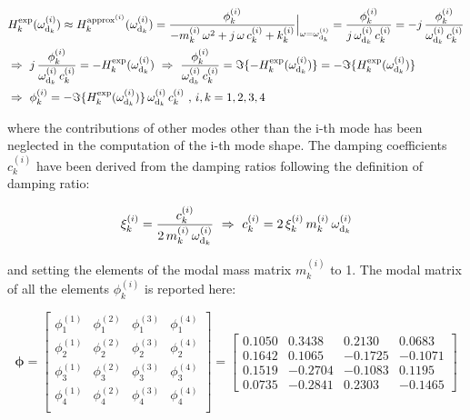 \documentclass[a4paper,12pt,oneside]{article}
\begin{document}
\[ \begin{split}
	& H^{\textup{exp}}_k(\omega_{\textup{d}_k}^{(i)}) \approx %
		H^{\textup{approx}^{(i)}}_k(\omega_{\textup{d}_k}^{(i)}) = %
		\frac{\phi^{(i)}_k} %
		{-m^{(i)}_k \, \omega^2 + j \, \omega \, c^{(i)}_k + k^{(i)}_k} %
		\Big|_{\omega = \omega_{\textup{d}_k}^{(i)}} = %
		\frac{\phi^{(i)}_k}{j \, \omega_{\textup{d}_k}^{(i)} \, c^{(i)}_k} = %
		-j \, \frac{\phi^{(i)}_k}{\omega_{\textup{d}_k}^{(i)} \, c^{(i)}_k} \\
	& \Rightarrow ~ %
		j \, \frac{\phi^{(i)}_k}{\omega_{\textup{d}_k}^{(i)} \, c^{(i)}_k} = %
		- H^{\textup{exp}}_k(\omega_{\textup{d}_k}^{(i)}) %
		~ \Rightarrow ~ \frac{\phi^{(i)}_k}{\omega_{\textup{d}_k}^{(i)} \, c^{(i)}_k} = %
		\Im\{- H^{\textup{exp}}_k(\omega_{\textup{d}_k}^{(i)})\} = %
		- \Im\{H^{\textup{exp}}_k(\omega_{\textup{d}_k}^{(i)})\} \\
	& \Rightarrow ~ \phi^{(i)}_k = %
		- \Im\{H^{\textup{exp}}_k(\omega_{\textup{d}_k}^{(i)})\} %
		\, \omega_{\textup{d}_k}^{(i)} \, c^{(i)}_k ~ \text{,} ~ i,k = 1,2,3,4
\end{split} \]

where the contributions of other modes other than the i-th mode has been neglected in the computation of the i-th mode shape. The damping coefficients $ c^{(i)}_k $ have been derived from the damping ratios following the definition of damping ratio:

\[ \begin{split}
	\xi^{(i)}_k = \frac{c^{(i)}_k}{2 \, m^{(i)}_k \, \omega_{\textup{d}_k}^{(i)}} %
		~ \Rightarrow ~ c^{(i)}_k = 2 \, \xi^{(i)}_k \, m^{(i)}_k \, %
		\omega_{\textup{d}_k}^{(i)}
\end{split} \]

and setting the elements of the modal mass matrix $ m^{(i)}_k $ to 1.
The modal matrix of all the elements $ \phi^{(i)}_k $ is reported here:

\[
	\bm{\phi} =	\begin{bmatrix}
								\phi_1^{(1)}	& \phi_1^{(2)} & \phi_1^{(3)}	& \phi_1^{(4)} \\
								\phi_2^{(1)}	& \phi_2^{(2)} & \phi_2^{(3)}	& \phi_2^{(4)} \\
								\phi_3^{(1)}	& \phi_3^{(2)} & \phi_3^{(3)}	& \phi_3^{(4)} \\
								\phi_4^{(1)}	& \phi_4^{(2)} & \phi_4^{(3)}	& \phi_4^{(4)} \\
							\end{bmatrix} = \begin{bmatrix}
																0.1050	& 0.3438	& 0.2130	& 0.0683 \\
																0.1642	& 0.1065	& -0.1725	& -0.1071 \\
																0.1519	& -0.2704	& -0.1083	& 0.1195 \\
																0.0735	& -0.2841	& 0.2303	& -0.1465
															\end{bmatrix}
\]
\end{document}

